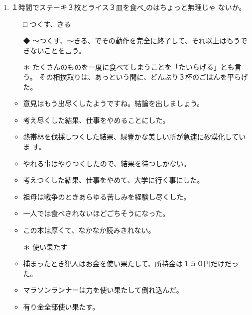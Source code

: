 \documentclass[
uplatex,
b5paper,
10pt,
dvipdfmx
]{jsbook}
\begin{document}
\begin{enumerate}
\item １時間でステーキ３枚とライス３皿を食べ\underline{   }のはちょ{}っと無理じゃ
      ないか。
\begin{itemize}
\item[□] つくす、きる
\item[◆] 〜つくす、〜きる、でその動作を完全に終了して、それ以上はもうで
	  きないことを言う。
\end{itemize}
\begin{itemize}
\item[＊] たくさんのものを一度に食べてしまうことを「たいらげる」とも言う。
	  その相撲取りは、あっという間に、どんぶり３杯のごはんを平らげた。
\item 意見はもう出尽くしたようですね。結論を出しましょう。
\item 考え尽くした結果、仕事をやめることにした。
\item 熱帯林を伐採しつくした結果、緑豊かな美しい所が急速に砂漠化していま
      す。
\item やれる事はやりつくしたので、結果を待つしかない。
\item 考えつくした結果、仕事をやめて、大学に行く事にした。
\item 祖母は戦争のときあらゆる苦しみを経験し尽くした。
\item 一人では食べきれないほどごちそうになった。
\item この本は厚くて、なかなか読みきれない。
\end{itemize}

\begin{itemize}
\item[＊] 使い果たす
\item 捕まったとき犯人はお金を使い果たして、所持金は１５０円だけだった。
\item マラソンランナーは力を使い果たして倒れ込んだ。
\item 有り金全部使い果たす。
\end{itemize}


\end{enumerate}
\end{document}

